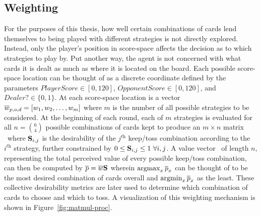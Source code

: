 

\subsection{Weighting}
\label{sec:dm-methods-weighting}



For the purposes of this thesis,
how well certain combinations of cards lend themselves to being played with 
different strategies is not directly explored.
%
Instead, only the player's position in score-space affects the decision as to
which strategies to play by.
%
Put another way, the agent is not concerned with  what cards it is dealt
as much as where it is located on the board.
%
Each possible score-space location can be thought of as a discrete coordinate
defined by the parameters
$\textit{PlayerScore} \in [0, 120]$,
$\textit{OpponentScore} \in [0, 120]$,
and
$\textit{Dealer?} \in \{0,1\}$.
%
At each score-space location is a vector $\overline{w}_{p,o,d} = [w_1,w_2,\ldots,w_m]$
where $m$ is the number of all possible strategies to be considered.
%
At the beginning of each round, each of $m$ strategies is evaluated for all
$n = {6 \choose 4}$ possible combinations of cards kept to produce an
$m \times n$ matrix \Smat\
where $\mathbf{S}_{i,j}$ is the desirability of the $j^{\textit{th}}$ keep/toss
combination according to the $i^{\textit{th}}$ strategy,
further constrained by
$0 \le \mathbf{S}_{i,j} \le 1\ \forall i,j$.
%
A value vector \pvec\ of length $n$,
representing the total perceived value of every possible keep/toss combination,
can then be computed by
$\overline{p} = \overline{w} \mathbf{S}$
wherein $\operatorname*{argmax}_{x}{\overline{p}_x}$ can be thought of to be the most desired combination
of cards overall and $\operatorname*{argmin}_{x}{\overline{p}_x}$ as the least.
%
These collective desirability metrics are later used to determine which
combination of cards to choose and which to toss.
%
A visualization of this weighting mechanism is shown in
Figure~\ref{fig:matmul-proc}.




